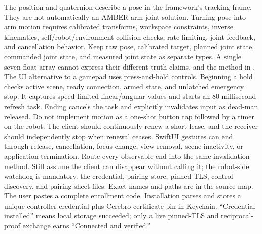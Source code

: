 {}The position and quaternion describe a pose in the framework's tracking frame. They are not automatically an AMBER arm joint solution. Turning pose into arm motion requires calibrated transforms, workspace constraints, inverse kinematics, self/robot/environment collision checks, rate limiting, joint feedback, and cancellation behavior.\markdownRendererParagraphSeparator
{}Keep raw pose, calibrated target, planned joint state, commanded joint state, and measured joint state as separate types. A single seven-float array cannot express their different truth claims.\markdownRendererInterblockSeparator
{}
\markdownRendererSectionEnd \markdownRendererSectionBegin
{}\markdownRendererInterblockSeparator
{}\markdownRendererBlockQuoteBegin
{}  and the  method in .\markdownRendererBlockQuoteEnd \markdownRendererInterblockSeparator
{}The UI alternative to a gamepad uses press-and-hold controls. Beginning a hold checks active scene, ready connection, armed state, and unlatched emergency stop. It captures speed-limited linear/angular values and starts an 80-millisecond refresh task. Ending cancels the task and explicitly invalidates input as dead-man released.\markdownRendererParagraphSeparator
{}Do not implement motion as a one-shot button tap followed by a timer on the robot. The client should continuously renew a short lease, and the receiver should independently stop when renewal ceases.\markdownRendererParagraphSeparator
{}SwiftUI gestures can end through release, cancellation, focus change, view removal, scene inactivity, or application termination. Route every observable end into the same invalidation method. Still assume the client can disappear without calling it; the robot-side watchdog is mandatory.\markdownRendererInterblockSeparator
{}
\markdownRendererSectionEnd \markdownRendererSectionBegin
{}\markdownRendererInterblockSeparator
{}\markdownRendererBlockQuoteBegin
{} the credential, pairing-store, pinned-TLS, control-discovery, and pairing-sheet files. Exact names and paths are in the source map.\markdownRendererBlockQuoteEnd \markdownRendererInterblockSeparator
{}The user pastes a complete  enrollment code. Installation parses and stores a unique controller credential plus Cerebro certificate pin in Keychain. “Credential installed” means local storage succeeded; only a live pinned-TLS and reciprocal-proof exchange earns “Connected and verified.”\markdownRendererParagraphSeparator
